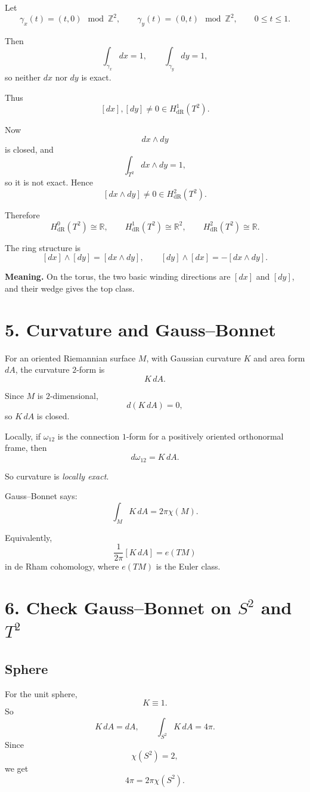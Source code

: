 \documentclass[11pt]{article}
\begin{document}
	Let
	\[
	\gamma_x(t)=(t,0)\mod \mathbb{Z}^2,\qquad
	\gamma_y(t)=(0,t)\mod \mathbb{Z}^2,\qquad 0\le t\le 1.
	\]
	
	Then
	\[
	\int_{\gamma_x}dx=1,\qquad \int_{\gamma_y}dy=1,
	\]
	so neither \(dx\) nor \(dy\) is exact.
	
	Thus
	\[
	[dx],[dy]\neq 0 \in H^1_{\mathrm{dR}}(T^2).
	\]
	
	Now
	\[
	dx\wedge dy
	\]
	is closed, and
	\[
	\int_{T^2}dx\wedge dy=1,
	\]
	so it is not exact. Hence
	\[
	[dx\wedge dy]\neq 0 \in H^2_{\mathrm{dR}}(T^2).
	\]
	
	Therefore
	\[
	H^0_{\mathrm{dR}}(T^2)\cong \mathbb{R},\qquad
	H^1_{\mathrm{dR}}(T^2)\cong \mathbb{R}^2,\qquad
	H^2_{\mathrm{dR}}(T^2)\cong \mathbb{R}.
	\]
	
	The ring structure is
	\[
	[dx]\wedge[dy]=[dx\wedge dy],\qquad
	[dy]\wedge[dx]=-[dx\wedge dy].
	\]
	
	\begin{framed}
		\noindent\textbf{Meaning.} On the torus, the two basic winding directions are \([dx]\) and \([dy]\), and their wedge gives the top class.
	\end{framed}
	
	\section*{5. Curvature and Gauss--Bonnet}
	
	For an oriented Riemannian surface \(M\), with Gaussian curvature \(K\) and area form \(dA\), the curvature \(2\)-form is
	\[
	K\,dA.
	\]
	
	Since \(M\) is \(2\)-dimensional,
	\[
	d(K\,dA)=0,
	\]
	so \(K\,dA\) is closed.
	
	Locally, if \(\omega_{12}\) is the connection \(1\)-form for a positively oriented orthonormal frame, then
	\[
	d\omega_{12}=K\,dA.
	\]
	
	So curvature is \emph{locally exact}.
	
	Gauss--Bonnet says:
	\[
	\boxed{\int_M K\,dA = 2\pi\chi(M).}
	\]
	
	Equivalently,
	\[
	\boxed{\frac{1}{2\pi}[K\,dA]=e(TM)}
	\]
	in de Rham cohomology, where \(e(TM)\) is the Euler class.
	
	\section*{6. Check Gauss--Bonnet on \(S^2\) and \(T^2\)}
	
	\subsection*{Sphere}
	For the unit sphere,
	\[
	K\equiv 1.
	\]
	So
	\[
	K\,dA=dA,
	\qquad
	\int_{S^2}K\,dA=4\pi.
	\]
	Since
	\[
	\chi(S^2)=2,
	\]
	we get
	\[
	4\pi=2\pi\chi(S^2).
	\]
	
\end{document}
